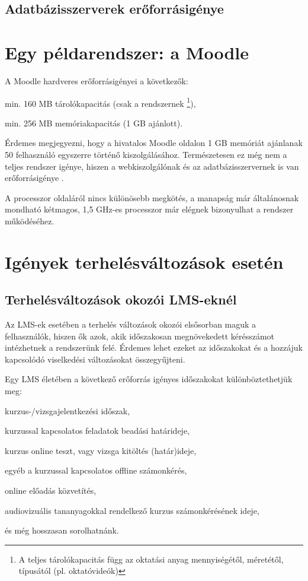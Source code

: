 \subsection{Adatbázisszerverek erőforrásigénye}


\section{Egy példarendszer: a Moodle}
A Moodle hardveres erőforrásigényei a következők:
\begin{sajat_itemize}
\item min. 160 MB tárolókapacitás (csak a rendszernek \footnote{A teljes tárolókapacitás függ az oktatási anyag mennyiségétől, méretétől, típusától (pl. oktatóvideók)}),
\item min. 256 MB memóriakapacitás (1 GB ajánlott).
\end{sajat_itemize}
Érdemes megjegyezni, hogy a hivatalos Moodle oldalon 1 GB memóriát ajánlanak 50 felhasználó egyszerre történő kiszolgálásához.
Természetesen ez még nem a teljes rendszer igénye, hiszen a webkiszolgálónak és az adatbázisszervernek is van erőforrásigénye \cite{moodleinst}.

A processzor oldaláról nincs különösebb megkötés, a manapság már általánosnak mondható kétmagos, 1,5 GHz-es processzor már elégnek bizonyulhat a rendszer működéséhez.

\section{Igények terhelésváltozások esetén}

\subsection{Terhelésváltozások okozói LMS-eknél}

Az LMS-ek esetében a terhelés változások okozói elsősorban maguk a felhasználók, hiszen ők azok, akik időszakosan megnövekedett kérésszámot intézhetnek a rendszerünk felé. Érdemes lehet ezeket az időszakokat és a hozzájuk kapcsolódó viselkedési változásokat összegyűjteni.

Egy LMS életében a következő erőforrás igényes időszakokat különböztethetjük meg:
\begin{sajat_itemize}
\item kurzus-/vizsgajelentkezési időszak,
\item kurzussal kapcsolatos feladatok beadási határideje,
\item kurzus online teszt, vagy vizsga kitöltés (határ)ideje,
\item egyéb a kurzussal kapcsolatos offline számonkérés,
\item online előadás közvetítés,
\item audiovizuális tananyagokkal rendelkező kurzus számonkérésének ideje, 
\end{sajat_itemize}
és még hosszasan sorolhatnánk.

